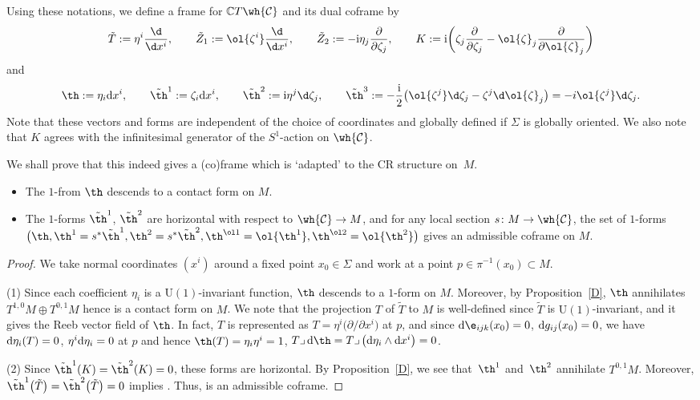 Using these notations, we define a frame
 for $\mathbb{C}T\wh{\mathcal{C}}$ and its dual coframe  by
\[
\tilde T:=\eta^i \frac{\d}{\d x^i}, \qquad \tilde Z_1:=\ol{\zeta^i}\frac{\d}{\d x^i}, \qquad \tilde Z_2:=-{\rm i}\eta_j\frac{\partial}{\partial \zeta_j}, \qquad
K:={\rm i}\biggl(\zeta_j\frac{\partial}{\partial \zeta_j}
-\ol{\zeta}_j\frac{\partial}{\partial \ol{\zeta}_j}\biggr)
\]
and
\[
\th:=\eta_i {\rm d}x^i, \qquad \tilde\th^1:=\zeta_i {\rm d}x^i, \qquad \tilde\th^2:={\rm i}\eta^j\d\zeta_j, \qquad \tilde\th^3:=-\frac{{\rm i}}{2}\bigl(\ol{\zeta^j}\d\zeta_j-\zeta^j\d\ol{\zeta}_j\bigr)=-i\ol{\zeta^j}\d\zeta_j.
\]
Note that these vectors and forms are independent of the choice of coordinates and globally defined if $\Sigma$ is globally oriented. We also note that $K$ agrees with the infinitesimal generator of the $S^1$-action on $\wh{\mathcal{C}}$.

We shall prove that this indeed gives a (co)frame which is `adapted' to the CR structure on~$M$.

\begin{Proposition}\quad
\begin{itemize}\itemsep=0pt
\item[$(1)$] The $1$-from $\th$ descends to a contact form on $M$.
\item[$(2)$] The $1$-forms $\tilde\th^1$, $\tilde\th^2$ are horizontal with respect to $\wh{\mathcal{C}}\to M$, and for any local section ${s\colon M\to \wh{\mathcal{C}}}$, the set of $1$-forms $\bigl(\th, \th^1=s^*\tilde\th^1, \th^2=s^*\tilde\th^2, \th^{\ol1}=\ol{\th^1}, \th^{\ol2}=\ol{\th^2}\bigr)$ gives an admissible coframe on $M$.
\end{itemize}
\end{Proposition}
\begin{proof}
We take normal coordinates $(x^i)$ around a fixed point $x_0\in \Sigma$ and work at a point $p\in\pi^{-1}(x_0)\subset M$.

(1) Since each coefficient $\eta_i$ is a $\mathrm{U}(1)$-invariant function, $\th$ descends to a $1$-form on $M$. Moreover, by Proposition~\ref{D}, $\th$ annihilates $T^{1, 0}M\oplus T^{0, 1}M$ hence is a contact form on $M$. We note that the projection $T$ of $\tilde T$ to $M$ is well-defined since $\tilde T$ is $\mathrm{U}(1)$-invariant, and it gives the Reeb vector field of $\th$. In fact, $T$ is represented as $T=\eta^i\bigl(\partial/\partial x^i\bigr)$ at $p$, and since
${\rm d}\e_{ijk}(x_0)=0$, ${\rm d}g_{ij}(x_0)=0$, we have ${\rm d}\eta_i(T)=0$, $\eta^i{\rm d}\eta_i=0$ at $p$ and hence $\th(T)=\eta_i\eta^i=1$, $T\lrcorner\, {\rm d}\th=T\lrcorner\, \bigl({\rm d}\eta_i\wedge {\rm d}x^i\bigr)=0$.

(2) Since $\tilde\th^1(K)=\tilde\th^2(K)=0$, these forms are horizontal. By Proposition~\ref{D}, we see that~$\th^1$ and~$\th^2$ annihilate $T^{0, 1}M$. Moreover, $\tilde\th^1\bigl(\tilde T\bigr)=\tilde\th^2\bigl(\tilde T\bigr)=0$ implies . Thus,  is an admissible coframe.
\end{proof}

